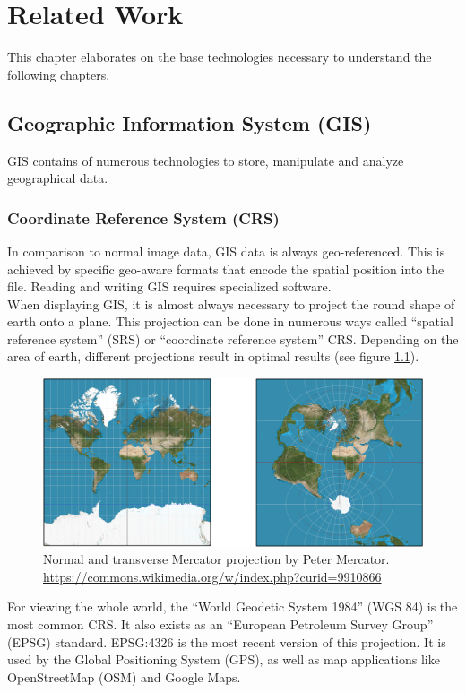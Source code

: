 
\chapter{Related Work}
This chapter elaborates on the base technologies necessary to understand the following chapters.


\section{Geographic Information System (GIS)}
GIS contains of numerous technologies to store, manipulate and analyze geographical data. 


\subsection{Coordinate Reference System (CRS)}
In comparison to normal image data, GIS data is always geo-referenced. This is achieved by specific geo-aware formats that encode the spatial position into the file. Reading and writing GIS requires specialized software.\\
When displaying GIS, it is almost always necessary to project the round shape of earth onto a plane. This projection can be done in numerous ways called \enquote{spatial reference system} (SRS) or  \enquote{coordinate reference system} CRS. Depending on the area of earth, different projections result in optimal results (see figure \ref{fig:mercator}).
\begin{figure}[H]
	\centering\includegraphics[width=1\textwidth]{res/Mercator}
	\caption{Normal and transverse Mercator projection by Peter Mercator. \url{https://commons.wikimedia.org/w/index.php?curid=9910866}}
	\label{fig:mercator}
\end{figure}
For viewing the whole world, the \enquote{World Geodetic System 1984} (WGS 84) is the most common CRS. It also exists as an \enquote{European Petroleum Survey Group}  (EPSG) standard. EPSG:4326 is the most recent version of this projection. It is used by the Global Positioning System (GPS), as well as map applications like OpenStreetMap (OSM) and Google Maps.


